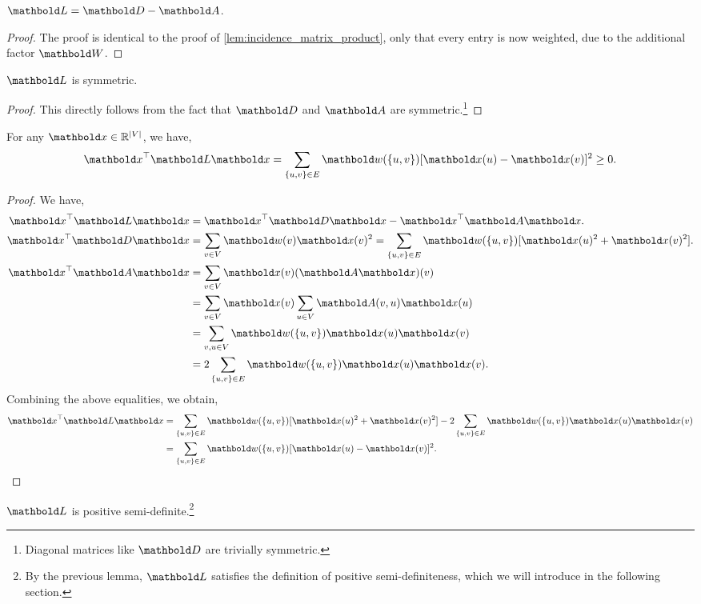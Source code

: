 \begin{lem}
$\mL = \mD - \mA$.
\end{lem}
\begin{proof}
The proof is identical to the proof of \cref{lem:incidence_matrix_product}, only that every entry is now weighted, due to the additional factor $\mW$.
\end{proof}

\begin{cor}
$\mL$ is symmetric.
\end{cor}
\begin{proof}
This directly follows from the fact that $\mD$ and $\mA$ are symmetric.\footnote{Diagonal matrices like $\mD$ are trivially symmetric.}
\end{proof}

\begin{lem}
For any $\vx \in \R^{|\sV|}$, we have, \begin{align}
    \trans{\vx}\mL\vx = \sum_{\{u,v\}\in\sE} \vw(\{u, v\})[\vx(u) - \vx(v)]^2 \geq 0.
\end{align}
\end{lem}
\begin{proof}
We have, \begin{align*}
    \trans{\vx}\mL\vx &= \trans{\vx}\mD\vx - \trans{\vx}\mA\vx. \\
    \trans{\vx}\mD\vx &= \sum_{v \in \sV} \vw(v) \vx(v)^2 = \sum_{\{u,v\}\in\sE} \vw(\{u,v\})[\vx(u)^2 + \vx(v)^2]. \\
    \trans{\vx}\mA\vx &= \sum_{v \in \sV} \vx(v) (\mA\vx)(v) \\
    &= \sum_{v \in \sV} \vx(v) \sum_{u \in \sV} \mA(v,u) \vx(u) \\
    &= \sum_{v,u \in \sV} \vw(\{u,v\})\vx(u)\vx(v) \\
    &= 2 \sum_{\{u,v\}\in\sE} \vw(\{u,v\})\vx(u)\vx(v).
\end{align*} Combining the above equalities, we obtain, \begin{align*}
    \trans{\vx}\mL\vx &= \sum_{\{u,v\}\in\sE} \vw(\{u,v\})[\vx(u)^2 + \vx(v)^2] - 2 \sum_{\{u,v\}\in\sE} \vw(\{u,v\})\vx(u)\vx(v) \\
    &= \sum_{\{u,v\}\in\sE} \vw(\{u,v\})[\vx(u) - \vx(v)]^2. \qedhere
\end{align*}
\end{proof}
\begin{cor}
$\mL$ is positive semi-definite.\footnote{By the previous lemma, $\mL$ satisfies the definition of positive semi-definiteness, which we will introduce in the following section.}
\end{cor}

